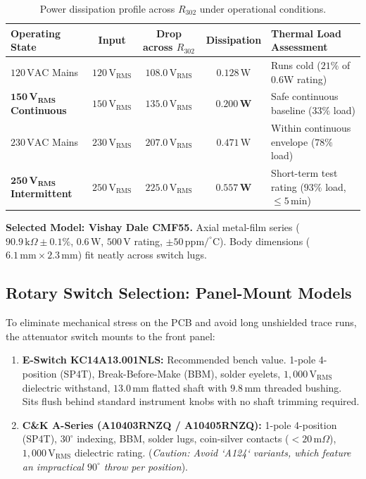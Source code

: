 \documentclass[11pt, letterpaper]{article}
\begin{document}
\begin{table}[H]
    \centering
    \small
    \setlength{\tabcolsep}{3pt}
    \begin{tabularx}{\linewidth}{@{} l c c c L @{}}
        \toprule
        \textbf{Operating State} & \textbf{Input} & \textbf{Drop across $R_{302}$} & \textbf{Dissipation} & \textbf{Thermal Load Assessment} \\
        \midrule
        $120\,\text{VAC}$ Mains & $120\,\text{V}_{\text{RMS}}$ & $108.0\,\text{V}_{\text{RMS}}$ & $0.128\,\text{W}$ & Runs cold ($21\%$ of 0.6W rating) \\
        $\mathbf{150\,\text{V}_{\text{RMS}}}$ \textbf{Continuous} & $150\,\text{V}_{\text{RMS}}$ & $135.0\,\text{V}_{\text{RMS}}$ & $\mathbf{0.200\,\text{W}}$ & Safe continuous baseline ($33\%$ load) \\
        $230\,\text{VAC}$ Mains & $230\,\text{V}_{\text{RMS}}$ & $207.0\,\text{V}_{\text{RMS}}$ & $0.471\,\text{W}$ & Within continuous envelope ($78\%$ load) \\
        $\mathbf{250\,\text{V}_{\text{RMS}}}$ \textbf{Intermittent} & $250\,\text{V}_{\text{RMS}}$ & $225.0\,\text{V}_{\text{RMS}}$ & $\mathbf{0.557\,\text{W}}$ & Short-term test rating ($93\%$ load, $\le 5$\,min) \\
        \bottomrule
    \end{tabularx}
    \caption{Power dissipation profile across $R_{302}$ under operational conditions.}
    \label{tab:resistor_stress}
\end{table}

\textbf{Selected Model: Vishay Dale CMF55.} Axial metal-film series ($90.9\,\text{k}\Omega \pm 0.1\%$, $0.6\,\text{W}$, $500\,\text{V}$ rating, $\pm 50\,\text{ppm}/^\circ\text{C}$). Body dimensions ($6.1\,\text{mm} \times 2.3\,\text{mm}$) fit neatly across switch lugs.

\subsection{Rotary Switch Selection: Panel-Mount Models}
To eliminate mechanical stress on the PCB and avoid long unshielded trace runs, the attenuator switch mounts to the front panel:
\begin{enumerate}[label=\textbf{\arabic*.}]
    \item \textbf{E-Switch KC14A13.001NLS:} Recommended bench value. 1-pole 4-position (SP4T), Break-Before-Make (BBM), solder eyelets, $1,000\,\text{V}_{\text{RMS}}$ dielectric withstand, $13.0\,\text{mm}$ flatted shaft with $9.8\,\text{mm}$ threaded bushing. Sits flush behind standard instrument knobs with no shaft trimming required.
    \item \textbf{C\&K A-Series (A10403RNZQ / A10405RNZQ):} 1-pole 4-position (SP4T), $30^\circ$ indexing, BBM, solder lugs, coin-silver contacts ($<20\,\text{m}\Omega$), $1,000\,\text{V}_{\text{RMS}}$ dielectric rating. (\textit{Caution: Avoid `A124` variants, which feature an impractical $90^\circ$ throw per position}).
\end{enumerate}
\end{document}
